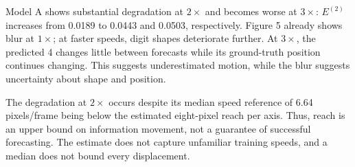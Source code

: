 Model A shows substantial degradation at $2\times$ and becomes worse at $3\times$: \(E^{(2)}\) increases from 0.0189 to 0.0443 and 0.0503, respectively. Figure 5 already shows blur at $1\times$; at faster speeds, digit shapes deteriorate further. At $3\times$, the predicted 4 changes little between forecasts while its ground-truth position continues changing. This suggests underestimated motion, while the blur suggests uncertainty about shape and position.

The degradation at $2\times$ occurs despite its median speed reference of 6.64 pixels/frame being below the estimated eight-pixel reach per axis. Thus, reach is an upper bound on information movement, not a guarantee of successful forecasting. The estimate does not capture unfamiliar training speeds, and a median does not bound every displacement.

